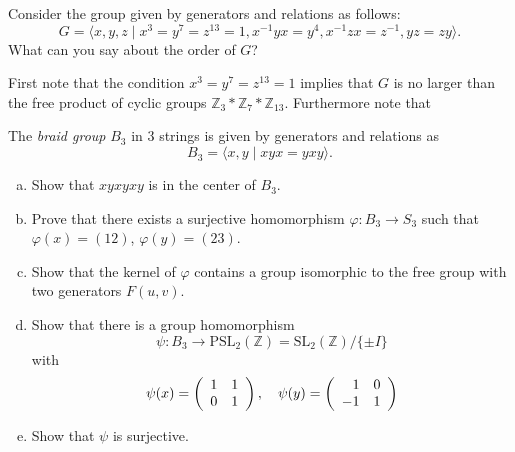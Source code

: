 \documentclass{article}
\newcounter{Problem}
\newenvironment{Problem}{\begin{Exercise}[name={Problem},
                                          counter={Problem}]}
                        {\end{Exercise}}
\begin{document}
\begin{Answer}

\end{Answer}

\pagebreak

\begin{Problem}
Consider the group given by generators and relations as follows:
$$
G = \langle
      x, y, z
    \mid
      x^3 = y^7 = z^{13} = 1,
      x^{-1} y x = y^4,
      x^{-1} z x = z^{-1},
      yz = zy
    \rangle.
$$
What can you say about the order of $G$?
\end{Problem}

\begin{Answer}
First note that the condition $x^3 = y^7 = z^{13} = 1$ implies that
$G$ is no larger than the free product of cyclic groups
$\mathbb{Z}_3 \ast \mathbb{Z}_7 \ast \mathbb{Z}_{13}$. Furthermore
note that
\end{Answer}

\pagebreak

\begin{Problem}
The \emph{braid group} $B_3$ in 3 strings is given by generators and
relations as
$$
B_3 = \langle x, y \mid xyx = yxy \rangle.
$$

\begin{enumerate}[(a)]
  \item{
    Show that $xyxyxy$ is in the center of $B_3$.
  }
  \item{
    Prove that there exists a surjective homomorphism
    $\varphi : B_3 \to S_3$ such that $\varphi(x) = (12)$,
    $\varphi(y) = (23)$.
  }
  \item{
    Show that the kernel of $\varphi$ contains a group isomorphic to
    the free group with two generators $F(u,v)$.
  }
  \item{
    Show that there is a group homomorphism
    $$
    \psi : B_3
       \to \mathrm{PSL}_2(\mathbb{Z})
         = \mathrm{SL}_2(\mathbb{Z}) / \{ \pm I \}
    $$
    with
    $$
    \psi(x) =
    \left(\begin{array}{r r}
      1 & 1 \\
      0 & 1
    \end{array}\right), \quad
    \psi(y) =
    \left(\begin{array}{r r}
      1 & 0 \\
     -1 & 1
    \end{array}\right)
    $$
  }
  \item{
    Show that $\psi$ is surjective.
  }
\end{enumerate}

\end{Problem}

\begin{Answer}

\end{Answer}

\pagebreak
\end{document}
